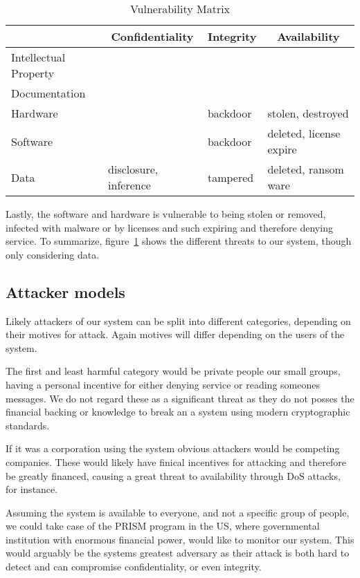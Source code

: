 \begin{table}[h!]
  \centering
  \begin{tabular}{l|l|l|l}
    \multicolumn{1}{c|}{} & \multicolumn{1}{c|}{\textbf{Confidentiality}} & \multicolumn{1}{c|}{\textbf{Integrity}} & \multicolumn{1}{c}{\textbf{Availability}} \\ \hline
    Intellectual Property &  & & \\ \hline
    Documentation & & & \\ \hline
    Hardware & & backdoor & stolen, destroyed \\ \hline
    Software & & backdoor & deleted, license expire \\ \hline
    Data & disclosure, inference & tampered & deleted, ransom ware
  \end{tabular}
  \caption{\label{tbl:vuln-matrix} Vulnerability Matrix}
\end{table}

Lastly, the software and hardware is vulnerable to being stolen or
removed, infected with malware or by licenses and such expiring and
therefore denying service. To summarize, figure~\ref{tbl:vuln-matrix}
shows the different threats to our system, though only considering
data.


\subsection{Attacker models}

Likely attackers of our system can be split into different
categories, depending on their motives for attack. Again motives will
differ depending on the users of the system.

The first and least harmful category would be private people our small
groups, having a personal incentive for either denying service or
reading someones messages. We do not regard these as a significant
threat as they do not posses the financial backing or knowledge to
break an a system using modern cryptographic standards.

If it was a corporation using the system obvious attackers would be
competing companies. These would likely have finical incentives for
attacking and therefore be greatly financed, causing a great threat to
availability through DoS attacks, for instance.

Assuming the system is available to everyone, and not a specific group
of people, we could take case of the PRISM program in the US, where
governmental institution with enormous financial power, would like to
monitor our system. This would arguably be the systems greatest
adversary as their attack is both hard to detect and can compromise
confidentiality, or even integrity.


